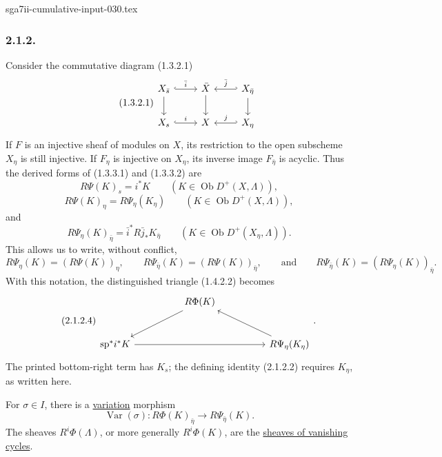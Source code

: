 \begin{filecontents*}{sga7ii-cumulative-input-030.tex}
\subsubsection*{2.1.2.}
Consider the commutative diagram (1.3.2.1)
\begin{equation}\tag{1.3.2.1}
\begin{tikzcd}
X_{\bar s} \arrow[r, hook, "\bar i"] \arrow[d]
  & \bar X \arrow[d]
  & X_{\bar\eta} \arrow[l, hook', "\bar j"'] \arrow[d] \\
X_s \arrow[r, hook, "i"] & X & X_\eta \arrow[l, hook', "j"']
\end{tikzcd}
\end{equation}
If $F$ is an injective sheaf of modules on $X$, its restriction to the
open subscheme $X_\eta$ is still injective.  If $F_\eta$ is injective
on $X_\eta$, its inverse image $F_{\bar\eta}$ is acyclic.  Thus the
derived forms of (1.3.3.1) and (1.3.3.2) are
\begin{equation}\tag{2.1.2.1}
R\Psi(K)_s=i^*K
\qquad(K\in\operatorname{Ob}D^+(X,\Lambda)),
\end{equation}
\begin{equation}\tag{2.1.2.2}
R\Psi(K)_\eta=R\Psi_\eta(K_\eta)
\qquad(K\in\operatorname{Ob}D^+(X,\Lambda)),
\end{equation}
and
\begin{equation}\tag{2.1.2.3}
R\Psi_\eta(K)_{\bar\eta}
=\bar i^*R\bar j_*K_{\bar\eta}
\qquad(K\in\operatorname{Ob}D^+(X_\eta,\Lambda)).
\end{equation}
This allows us to write, without conflict,
\begin{equation*}
R\Psi_\eta(K)=(R\Psi(K))_\eta,
\qquad
R\Psi_{\bar\eta}(K)=(R\Psi(K))_{\bar\eta},
\qquad\text{and}\qquad
R\Psi_{\bar\eta}(K)=(R\Psi_\eta(K))_{\bar\eta}.
\end{equation*}
With this notation, the distinguished triangle (1.4.2.2) becomes
\begin{equation}\tag{2.1.2.4}
\begin{tikzcd}[row sep=large, column sep=huge]
{} & R\Phi(K) \arrow[dl] & {} \\
\mathrm{sp}^*i^*K \arrow[rr] & {}
  & R\Psi_\eta(K_\eta) \arrow[ul]
\end{tikzcd}
.\end{equation}
The printed bottom-right term has $K_s$; the defining identity
(2.1.2.2) requires $K_\eta$, as written here.

For $\sigma\in I$, there is a \underline{variation} morphism
\begin{equation}\tag{2.1.2.5}
\operatorname{Var}(\sigma):R\Phi(K)_{\bar\eta}
\longrightarrow R\Psi_{\bar\eta}(K).
\end{equation}
The sheaves $R^i\Phi(\Lambda)$, or more generally $R^i\Phi(K)$, are
the \underline{sheaves of vanishing cycles}.


\end{filecontents*}
